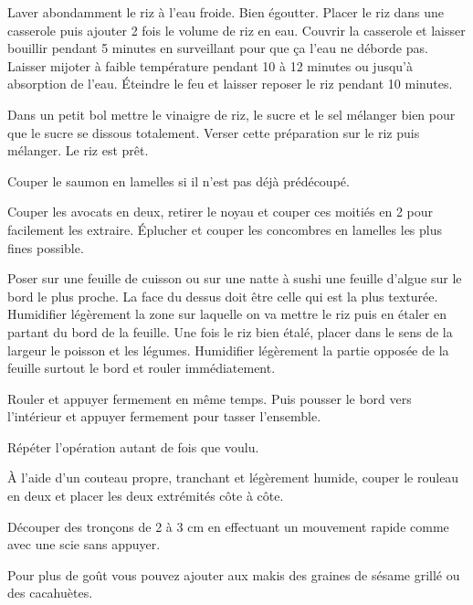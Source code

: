 \begin{steps}
    \item Laver abondamment le riz à l’eau froide. Bien égoutter. Placer le riz dans une casserole puis ajouter 2 fois le volume de riz en eau. Couvrir la casserole et laisser bouillir pendant 5 minutes en surveillant pour que ça l’eau ne déborde pas. Laisser mijoter à faible température pendant 10 à 12 minutes ou jusqu’à absorption de l’eau. Éteindre le feu et laisser reposer le riz pendant 10 minutes.
    \item Dans un petit bol mettre le vinaigre de riz, le sucre et le sel mélanger bien pour que le sucre se dissous totalement. Verser cette préparation sur le riz puis mélanger. Le riz est prêt.
    \item Couper le saumon en lamelles si il n’est pas déjà prédécoupé.
    \item Couper les avocats en deux, retirer le noyau et couper ces moitiés en 2 pour facilement les extraire. Éplucher et couper les concombres en lamelles les plus fines possible.
    \item Poser sur une feuille de cuisson ou sur une natte à sushi une feuille d’algue sur le bord le plus proche. La face du dessus doit être celle qui est la plus texturée. Humidifier légèrement la zone sur laquelle on va mettre le riz puis en étaler en partant du bord de la feuille. Une fois le riz bien étalé, placer dans le sens de la largeur le poisson et les légumes. Humidifier légèrement la partie opposée de la feuille surtout le bord et rouler immédiatement.
    \item Rouler et appuyer fermement en même temps. Puis pousser le bord vers l’intérieur et appuyer fermement pour tasser l’ensemble.
    \item Répéter l’opération autant de fois que voulu.
    \item À l’aide d’un couteau propre, tranchant et légèrement humide, couper le rouleau en deux et placer les deux extrémités côte à côte.
    \item Découper des tronçons de 2 à 3 cm en effectuant un mouvement rapide comme avec une scie sans appuyer.
    \item Pour plus de goût vous pouvez ajouter aux makis des graines de sésame grillé ou des cacahuètes.
\end{steps}
